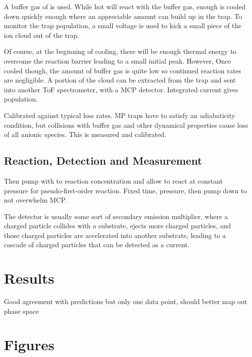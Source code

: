 \documentclass[12pt]{article}
\begin{document}
A buffer gas of  is used. While hot  will react with the  buffer gas, enough is cooled down quickly enough where an appreciable amount can build up in the trap. To monitor the trap population, a small voltage is used to kick a small piece of the ion cloud out of the trap.

Of course, at the beginning of cooling, there will be enough thermal energy to overcome the reaction barrier leading to a small initial  peak. However, Once cooled though, the amount of buffer gas is quite low so continued reaction rates are negligible. A portion of the cloud can be extracted from the trap and sent into another ToF spectrometer, with a MCP detector. Integrated current gives population.

Calibrated against typical loss rates. MP traps have to satisfy an adiabaticity condition, but collisions with buffer gas and other dynamical properties cause loss of all anionic species. This is measured and calibrated.


\subsection{Reaction, Detection and Measurement}
Then pump with  to reaction concentration and allow to react at constant pressure for pseudo-first-order reaction. Fixed time, pressure, then pump down to not overwhelm MCP.\@

The detector is usually some sort of secondary emission multiplier, where a charged particle collides with a substrate, ejects more charged particles, and those charged particles are accelerated into another substrate, leading to a cascade of charged particles that can be detected as a current.

\section{Results}
Good agreement with predictions but only one data point, should better map out phase space
\newpage
\section{Figures}

\newpage{}

%

\newpage{}
\appendix{}
\end{document}
